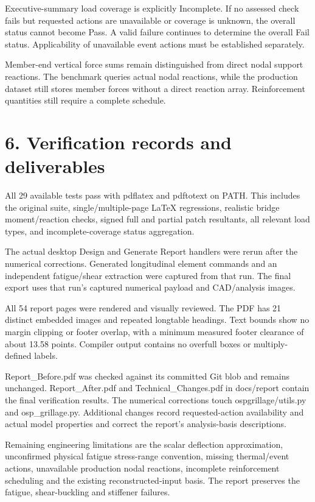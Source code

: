 \documentclass{article}%
\begin{document}
%
Executive{-}summary load coverage is explicitly Incomplete. If no assessed check fails but requested actions are unavailable or coverage is unknown, the overall status cannot become Pass. A valid failure continues to determine the overall Fail status. Applicability of unavailable event actions must be established separately.%


%
Member{-}end vertical force sums remain distinguished from direct nodal support reactions. The benchmark queries actual nodal reactions, while the production dataset still stores member forces without a direct reaction array. Reinforcement quantities still require a complete schedule.%

%
\section*{6. Verification records and deliverables}%
\label{sec:6.Verificationrecordsanddeliverables}%
All 29 available tests pass with pdflatex and pdftotext on PATH. This includes the original suite, single/multiple{-}page LaTeX regressions, realistic bridge moment/reaction checks, signed full and partial patch resultants, all relevant load types, and incomplete{-}coverage status aggregation.%


%
The actual desktop Design and Generate Report handlers were rerun after the numerical corrections. Generated longitudinal element commands and an independent fatigue/shear extraction were captured from that run. The final export uses that run's captured numerical payload and CAD/analysis images.%


%
All 54 report pages were rendered and visually reviewed. The PDF has 21 distinct embedded images and repeated longtable headings. Text bounds show no margin clipping or footer overlap, with a minimum measured footer clearance of about 13.58 points. Compiler output contains no overfull boxes or multiply{-}defined labels.%


%
Report\_Before.pdf was checked against its committed Git blob and remains unchanged. Report\_After.pdf and Technical\_Changes.pdf in docs/report contain the final verification results. The numerical corrections touch ospgrillage/utils.py and osp\_grillage.py. Additional changes record requested{-}action availability and actual model properties and correct the report's analysis{-}basis descriptions.%


%
Remaining engineering limitations are the scalar deflection approximation, unconfirmed physical fatigue stress{-}range convention, missing thermal/event actions, unavailable production nodal reactions, incomplete reinforcement scheduling and the existing reconstructed{-}input basis. The report preserves the fatigue, shear{-}buckling and stiffener failures.%

%
\end{document}
